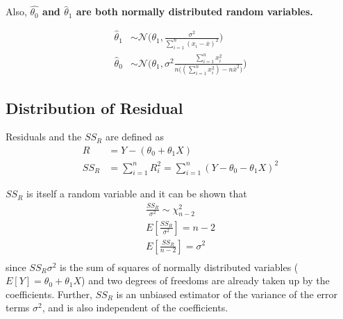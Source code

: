 \documentclass[../probability-notes.tex]{subfiles}
\begin{document}
    Also, \textbf{$\hat{\theta_{0}}$ and $\hat{\theta}_{1}$ are both normally distributed random variables.}

    \begin{align*}
        \hat{\theta}_{1} &\sim \mathcal{N}\bigg(\theta_{1}, \frac{\sigma^{2}}{\sum_{i=1}^{n}(x_{i} - \overline{x})^{2}} \bigg)\\
        \hat{\theta}_{0} &\sim \mathcal{N}\bigg(\theta_{1}, \sigma^{2} \frac{\sum_{i=1}^{n} x_{i}^{2}}{n\big((\sum_{i=1}^{n} x_{i}^{2}) - n\bar{x}^{2} \big)} \bigg)
    \end{align*}


    \subsection{Distribution of Residual}
    Residuals and the $SS_{R}$ are defined as
    \begin{align*}
        R &= Y - (\theta_{0} + \theta_{1}X)\\
        SS_{R} &= \sum_{i=1}^{n} R_{i}^{2} = \sum_{i=1}^{n} (Y - \theta_{0} - \theta_{1}X)^{2}
    \end{align*}

    $SS_{R}$ is itself a random variable and it can be shown that
    \begin{align*}
        \frac{SS_{R}}{\sigma^{2}} \sim \chi_{n-2}^{2}\\
        E[\frac{SS_{R}}{\sigma^{2}}] = n - 2\\
        E[\frac{SS_{R}}{n-2}] = \sigma^{2}\\
    \end{align*}
    since $SS_{R}\sigma^{2}$ is the sum of squares of normally distributed variables ($E[Y] = \theta_{0} + \theta_{1}X$) and two degrees of freedoms are already taken up by the coefficients. Further, $SS_{R}$ is an unbiased estimator of the variance of the error terms $\sigma^{2}$, and is also independent of the coefficients.
\end{document}
